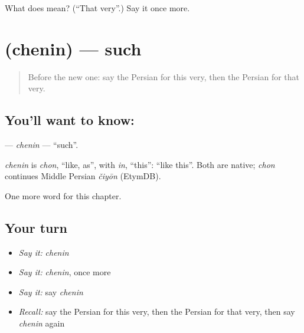 \begin{tcolorbox}[breakable,colback=teal!4,colframe=teal!35!black,title={Before you move on}]
What does  mean? (\textquotedblleft{}That very\textquotedblright{}.) Say it once more.
\end{tcolorbox}
\section[\texorpdfstring{\fa{چنین} (chenin)}{چنین (chenin)}]{ (chenin) — such}

\label{lesson:FA-C83-chenin}



\begin{quote}
Before the new one: say the Persian for this very, then the Persian for that very.
\end{quote}

\subsection*{You'll want to know: }
\textbf{} — \emph{chenin} — \textquotedblleft{}such\textquotedblright{}.

\begin{cousinweb}
\emph{chenin} is \emph{chon}, \textquotedblleft{}like, as\textquotedblright{}, with \emph{in}, \textquotedblleft{}this\textquotedblright{}: \textquotedblleft{}like this\textquotedblright{}. Both are native; \emph{chon} continues Middle Persian \emph{čiyōn} (EtymDB).
\end{cousinweb}

\begin{grammarlens}[title={What you've built}]
One more word for this chapter.
\end{grammarlens}

\subsection*{Your turn}
\begin{itemize}
\raggedright
  \item \emph{Say it:} \emph{chenin}
  \item \emph{Say it:} \emph{chenin}, once more
  \item \emph{Say it:} say \emph{chenin}
  \item \emph{Recall:} say the Persian for this very, then the Persian for that very, then say \emph{chenin} again
\end{itemize}

